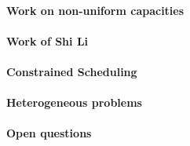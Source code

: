 \paragraph{Work on non-uniform capacities}
\paragraph{Work of Shi Li}
\paragraph{Constrained Scheduling}
\paragraph{Heterogeneous problems}
\paragraph{Open questions}


